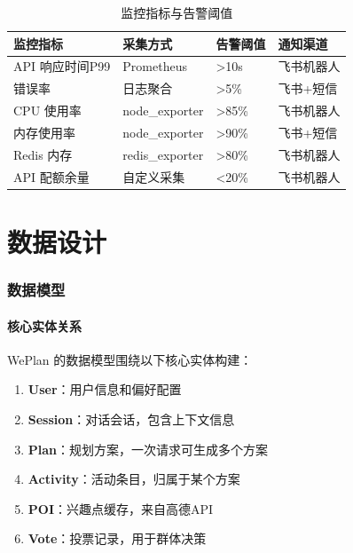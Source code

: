\documentclass[12pt,a4paper]{ctexart}
\begin{document}
\begin{table}[H]
\centering
\caption{监控指标与告警阈值}
\label{tab:monitoring}
\renewcommand{\arraystretch}{1.3}
{\small
\begin{tabular}{p{3.5cm} p{3cm} p{2.5cm} p{3cm}}
\toprule
\textbf{监控指标} & \textbf{采集方式} & \textbf{告警阈值} & \textbf{通知渠道} \\
\midrule
API 响应时间P99 & Prometheus & >10s & 飞书机器人 \\
错误率 & 日志聚合 & >5\% & 飞书+短信 \\
CPU 使用率 & node\_exporter & >85\% & 飞书机器人 \\
内存使用率 & node\_exporter & >90\% & 飞书+短信 \\
Redis 内存 & redis\_exporter & >80\% & 飞书机器人 \\
API 配额余量 & 自定义采集 & <20\% & 飞书机器人 \\
\bottomrule
\end{tabular}
}
\end{table}

\newpage


\part{数据设计}

\section{数据模型}

\subsection{核心实体关系}

WePlan 的数据模型围绕以下核心实体构建：

\begin{enumerate}[leftmargin=2em]
  \item \textbf{User}：用户信息和偏好配置
  \item \textbf{Session}：对话会话，包含上下文信息
  \item \textbf{Plan}：规划方案，一次请求可生成多个方案
  \item \textbf{Activity}：活动条目，归属于某个方案
  \item \textbf{POI}：兴趣点缓存，来自高德API
  \item \textbf{Vote}：投票记录，用于群体决策
\end{enumerate}
\end{document}
